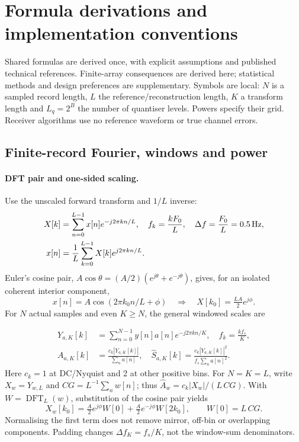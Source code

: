 \section{Formula derivations and implementation conventions}
\label{app:derivations}
Shared formulas are derived once, with explicit assumptions and published technical references.
Finite-array consequences are derived here; statistical methods and design
preferences are supplementary. Symbols are local: $N$ is a sampled record
length, $L$ the reference/reconstruction length, $K$ a transform length and
$L_q=2^B$ the number of quantiser levels. Powers specify their grid.
Receiver algorithms use no reference waveform or true channel errors.

\subsection{Finite-record Fourier, windows and power}
\label{app:dft}
\paragraph{DFT pair and one-sided scaling.}
Use the unscaled forward transform and $1/L$ inverse:
\begin{align}
 X[k]&=\sum_{n=0}^{L-1}x[n]e^{-j2\pi kn/L},\quad
 f_k=\frac{kF_0}{L},\quad\Delta f=\frac{F_0}{L}=0.5\,\mathrm{Hz},
 \label{eq:r11-dft}\\
 x[n]&=\frac1L\sum_{k=0}^{L-1}X[k]e^{j2\pi kn/L}.
 \label{eq:inverse}
\end{align}
Euler's cosine pair, $A\cos\theta=(A/2)(e^{j\theta}+e^{-j\theta})$,
gives, for an isolated coherent interior component,
\begin{equation}
 x[n]=A\cos(2\pi k_0n/L+\phi)
 \quad\Longrightarrow\quad X[k_0]=\tfrac{LA}{2}e^{j\phi}.
 \label{eq:cosine-amplitude}
\end{equation}
For $N$ actual samples and even $K\ge N$, the general windowed scales are

\begin{align}
 Y_{a,K}[k]&=\sum_{n=0}^{N-1}y[n]a[n]e^{-j2\pi kn/K},\quad
 f_k=\frac{kf_s}{K},\nonumber\\
 A_{a,K}[k]&=\frac{c_k|Y_{a,K}[k]|}{\sum_na[n]},\quad
 \widehat S_{a,K}[k]=\frac{c_k|Y_{a,K}[k]|^2}{f_s\sum_na[n]^2}.
 \label{eq:r22-spectrum-scales}
\end{align}
Here $c_k=1$ at DC/Nyquist and 2 at other positive bins. For $N=K=L$,
write $X_w=Y_{w,L}$ and $CG=L^{-1}\sum_nw[n]$; thus
$\widehat A_w=c_k|X_w|/(L\,CG)$. With $W=\operatorname{DFT}_L(w)$,
substitution of the cosine pair yields
\begin{equation}
 X_w[k_0]=\tfrac A2e^{j\phi}W[0]+\tfrac A2e^{-j\phi}W[2k_0],
 \qquad W[0]=L\,CG.
 \label{eq:window-gain-derivation}
\end{equation}
Normalising the first term does not remove mirror, off-bin or overlapping
components. Padding changes $\Delta f_K=f_s/K$, not the window-sum denominators.

